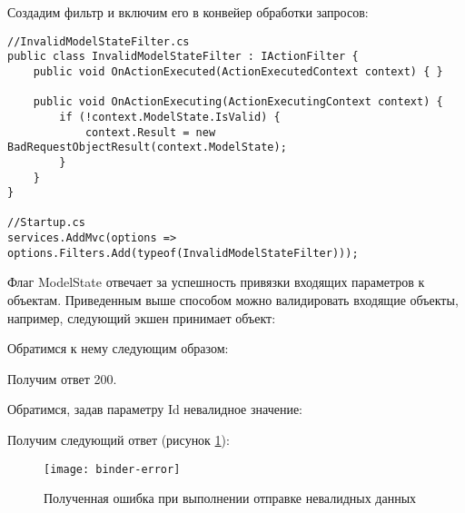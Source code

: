 \documentclass[a4paper,14pt]{extarticle}
\begin{document}
Создадим фильтр и включим его в конвейер обработки запросов:

\begin{lstlisting}
//InvalidModelStateFilter.cs
public class InvalidModelStateFilter : IActionFilter {
    public void OnActionExecuted(ActionExecutedContext context) { }

    public void OnActionExecuting(ActionExecutingContext context) {
        if (!context.ModelState.IsValid) {
            context.Result = new BadRequestObjectResult(context.ModelState);
        }
    }
}

//Startup.cs
services.AddMvc(options => options.Filters.Add(typeof(InvalidModelStateFilter)));
\end{lstlisting}

Флаг ModelState отвечает за успешность привязки входящих параметров к объектам.
Приведенным выше способом можно валидировать входящие объекты, например, следующий
экшен принимает объект:


Обратимся к нему следующим образом:


Получим ответ 200.

Обратимся, задав параметру Id невалидное значение:


Получим следующий ответ (рисунок \ref{fig:binder-error}):

\begin{figure}[H]
    \centering
    \texttt{[image: binder-error]}
    \caption{Полученная ошибка при выполнении отправке невалидных данных}
    \label{fig:binder-error}
\end{figure}
\end{document}
